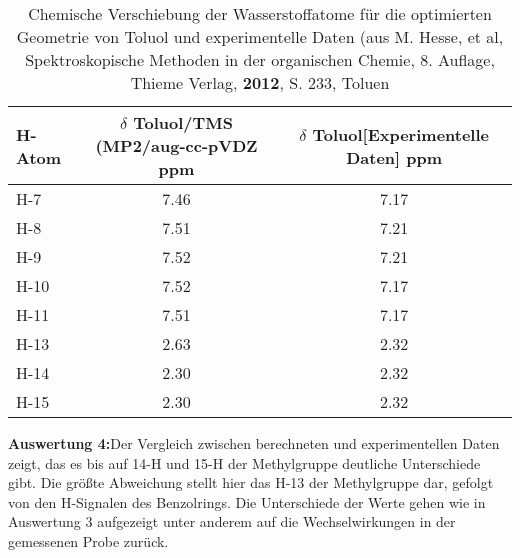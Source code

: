 \documentclass[12pt]{article}
\begin{document}
\begin{onehalfspace}
\begin{table}[!htpb]
\caption{Chemische Verschiebung der Wasserstoffatome für die optimierten Geometrie von Toluol und experimentelle Daten (aus M. Hesse, et al, Spektroskopische Methoden in der organischen Chemie, 8. Auflage, Thieme Verlag, \textbf{2012}, S. 233, Toluen}
\begin{tabular}{lcc}
\toprule
H-Atom  & \parbox[t]{4cm}{$\delta$ Toluol/TMS \\ (MP2/aug-cc-pVDZ\\ ppm}  &  \parbox[t]{4cm}{$\delta$ Toluol[Experimentelle Daten] ppm}\\
\midrule
H-7  & 7.46 & 7.17  \\
H-8  & 7.51 & 7.21   \\
H-9  &  7.52 & 7.21   \\
H-10 & 7.52 & 7.17 \\
H-11 & 7.51 & 7.17  \\
H-13 & 2.63& 2.32  \\
H-14 & 2.30 & 2.32 \\
H-15 & 2.30 & 2.32  \\
\bottomrule
\end{tabular}
\end{table}
\pagebreak
\textbf{Auswertung 4:}Der Vergleich zwischen berechneten und experimentellen Daten zeigt, das  es bis auf 14-H und 15-H der Methylgruppe deutliche Unterschiede gibt. Die größte Abweichung stellt hier das H-13 der Methylgruppe dar, gefolgt von den H-Signalen des Benzolrings. Die Unterschiede der Werte gehen wie in Auswertung 3 aufgezeigt unter anderem auf die Wechselwirkungen in der gemessenen Probe zurück.


\end{onehalfspace}
\end{document}
